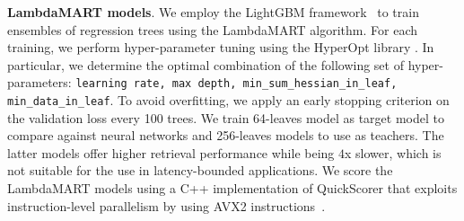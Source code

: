 \smallskip
\noindent \textbf{LambdaMART models}. We employ the LightGBM framework~\cite{NIPS2017_6907} to train ensembles of regression trees using the LambdaMART algorithm. For each training, we perform hyper-parameter tuning using the HyperOpt library \cite{bergstra2013making}.
In particular, we determine the optimal combination of the following set of hyper-parameters: \texttt{learning rate, max depth, min\_sum\_hessian\_in\_leaf, min\_data\_in\_leaf}. 
To avoid overfitting, we apply an early stopping criterion on the validation loss every 100 trees. We train 64-leaves model as target model to compare against neural networks and 256-leaves models to use as teachers. The latter models offer higher retrieval performance while being $4$x slower, which is not suitable for the use in latency-bounded applications. We score the LambdaMART models using a C++ implementation of QuickScorer that exploits instruction-level parallelism by using AVX2 instructions~\cite{8035185}.

